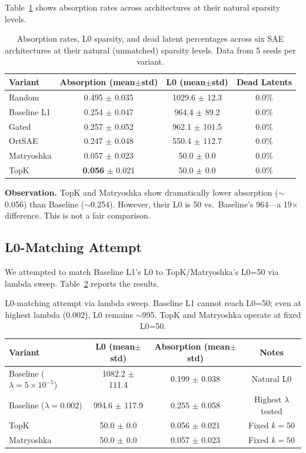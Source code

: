 \documentclass{article}
\begin{document}
Table~\ref{tab:crossarch} shows absorption rates across architectures at their natural sparsity levels.

\begin{table}[t]
\caption{Absorption rates, L0 sparsity, and dead latent percentages across six SAE architectures at their natural (unmatched) sparsity levels. Data from 5 seeds per variant.}
\label{tab:crossarch}
\centering
\begin{tabular}{lccc}
\toprule
Variant & Absorption (mean$\pm$std) & L0 (mean$\pm$std) & Dead Latents \\
\midrule
Random & 0.495 $\pm$ 0.035 & 1029.6 $\pm$ 12.3 & 0.0\% \\
Baseline L1 & 0.254 $\pm$ 0.047 & 964.4 $\pm$ 89.2 & 0.0\% \\
Gated & 0.257 $\pm$ 0.052 & 962.1 $\pm$ 101.5 & 0.0\% \\
OrtSAE & 0.247 $\pm$ 0.048 & 550.4 $\pm$ 112.7 & 0.0\% \\
Matryoshka & 0.057 $\pm$ 0.023 & 50.0 $\pm$ 0.0 & 0.0\% \\
TopK & \textbf{0.056} $\pm$ 0.021 & 50.0 $\pm$ 0.0 & 0.0\% \\
\bottomrule
\end{tabular}
\end{table}

\textbf{Observation.} TopK and Matryoshka show dramatically lower absorption ($\sim$0.056) than Baseline ($\sim$0.254). However, their L0 is 50 vs.~Baseline's 964---a 19$\times$ difference. This is not a fair comparison.

\subsection{L0-Matching Attempt}

We attempted to match Baseline L1's L0 to TopK/Matryoshka's L0=50 via lambda sweep. Table~\ref{tab:matching} reports the results.

\begin{table}[t]
\caption{L0-matching attempt via lambda sweep. Baseline L1 cannot reach L0=50; even at highest lambda (0.002), L0 remains $\sim$995. TopK and Matryoshka operate at fixed L0=50.}
\label{tab:matching}
\centering
\begin{tabular}{lccc}
\toprule
Variant & L0 (mean$\pm$std) & Absorption (mean$\pm$std) & Notes \\
\midrule
Baseline ($\lambda=5\times10^{-5}$) & 1082.2 $\pm$ 111.4 & 0.199 $\pm$ 0.038 & Natural L0 \\
Baseline ($\lambda=0.002$) & 994.6 $\pm$ 117.9 & 0.255 $\pm$ 0.058 & Highest $\lambda$ tested \\
TopK & 50.0 $\pm$ 0.0 & 0.056 $\pm$ 0.021 & Fixed $k=50$ \\
Matryoshka & 50.0 $\pm$ 0.0 & 0.057 $\pm$ 0.023 & Fixed $k=50$ \\
\bottomrule
\end{tabular}
\end{table}
\end{document}
